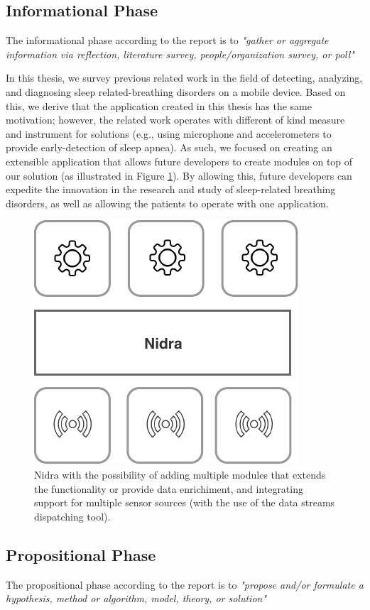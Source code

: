 \newpage
\subsection{Informational Phase}
The informational phase according to the report is to \textit{"gather or aggregate information via reflection, literature survey, people/organization survey, or poll"}

In this thesis, we survey previous related work in the field of detecting, analyzing, and diagnosing sleep related-breathing disorders on a mobile device. Based on this, we derive that the application created in this thesis has the same motivation; however, the related work operates with different of kind measure and instrument for solutions (e.g., using microphone and accelerometers to provide early-detection of sleep apnea). As such, we focused on creating an extensible application that allows future developers to create modules on top of our solution (as illustrated in Figure \ref{fig:nidra_modules}). By allowing this, future developers can expedite the innovation in the research and study of sleep-related breathing disorders, as well as allowing the patients to operate with one application. 

\begin{figure}
    \centering
    \includegraphics[scale=0.9]{images/Nidram2.pdf}
    \caption{Nidra with the possibility of adding multiple modules that extends the functionality or provide data enrichiment, and integrating support for multiple sensor sources (with the use of the data streams dispatching tool).}
    \label{fig:nidra_modules}
\end{figure}

\subsection{Propositional Phase}
The propositional phase according to the report is to \textit{"propose and/or formulate a hypothesis, method or algorithm, model, theory, or solution"}


